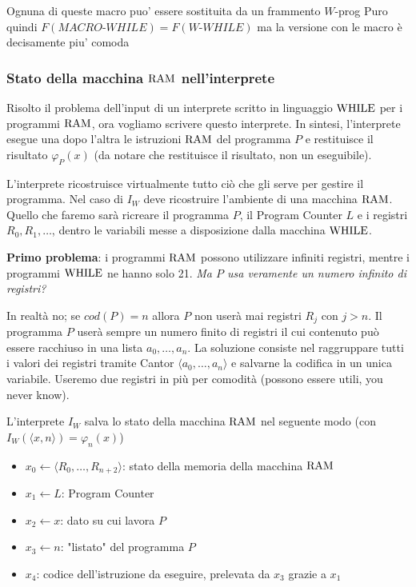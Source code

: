Ognuna di queste macro puo' essere sostituita da un frammento $W$-prog Puro quindi $F(MACRO\text{-}WHILE) = F(W\text{-}WHILE)$ ma la versione con le macro è decisamente piu' comoda

\subsubsection{Stato della macchina $\text{RAM}$ nell'interprete}

Risolto il problema dell'input di un interprete scritto in linguaggio $\text{WHILE}$ per i programmi $\text{RAM}$, ora vogliamo scrivere questo interprete. In sintesi, l'interprete esegue una dopo l'altra le istruzioni $\text{RAM}$ del programma $P$ e restituisce il risultato $\varphi_P (x)$ (da notare che restituisce il risultato, non un eseguibile).

L'interprete ricostruisce virtualmente tutto ciò che gli serve per gestire il programma. Nel caso di $I_W$ deve ricostruire l'ambiente di una macchina $\text{RAM}$. Quello che faremo sarà ricreare il programma $P$, il Program Counter $L$ e i registri $R_0, R_1, \dots$, dentro le variabili messe a disposizione dalla macchina $\text{WHILE}$.

\textbf{Primo problema}: i programmi $\text{RAM}$ possono utilizzare infiniti registri, mentre i programmi $\text{WHILE}$ ne hanno solo 21. \textit{Ma $P$ usa veramente un numero infinito di registri?}

In realtà no; se $cod(P) = n$ allora $P$ non userà mai registri $R_j$ con $j > n$. Il programma $P$ userà sempre un numero finito di registri il cui contenuto può essere racchiuso in una lista $a_0, \dots, a_n$. La soluzione consiste nel raggruppare tutti i valori dei registri tramite Cantor $\langle a_0, \dots, a_n \rangle$ e salvarne la codifica in un unica variabile. Useremo due registri in più per comodità (possono essere utili, you never know).

L'interprete $I_W$ salva lo stato della macchina $\text{RAM}$ nel seguente modo (con $I_W (\langle x,n\rangle) = \varphi_n (x)$)
\begin{itemize}
	\item $x_0 \leftarrow \langle R_0, \dots, R_{n+2} \rangle$: stato della memoria della macchina $\text{RAM}$
	\item $x_1 \leftarrow L$: Program Counter
	\item $x_2 \leftarrow x$: dato su cui lavora $P$
	\item $x_3 \leftarrow n$: "listato" del programma $P$
	\item $x_4$: codice dell'istruzione da eseguire, prelevata da $x_3$ grazie a $x_1$
\end{itemize}

